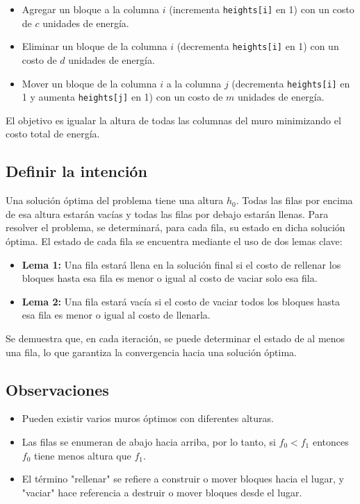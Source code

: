 \documentclass[a4paper,12pt]{article}
\begin{document}
\begin{itemize}
	\item Agregar un bloque a la columna $i$ (incrementa \texttt{heights[i]} en 1) con un costo de $c$ unidades de energía.
	\item Eliminar un bloque de la columna $i$ (decrementa \texttt{heights[i]} en 1) con un costo de $d$ unidades de energía.
	\item Mover un bloque de la columna $i$ a la columna $j$ (decrementa \texttt{heights[i]} en 1 y aumenta \texttt{heights[j]} en 1) con un costo de $m$ unidades de energía.
\end{itemize}

El objetivo es igualar la altura de todas las columnas del muro minimizando el costo total de energía.

\subsection{Definir la intención}

Una solución óptima del problema tiene una altura $h_0$. Todas las filas por encima de esa altura estarán vacías y todas las filas por debajo estarán llenas. Para resolver el problema, se determinará, para cada fila, su estado en dicha solución óptima. El estado de cada fila se encuentra mediante el uso de dos lemas clave:

\begin{itemize}
	\item \textbf{Lema 1:} Una fila estará llena en la solución final si el costo de rellenar los bloques hasta esa fila es menor o igual al costo de vaciar solo esa fila.
	\item \textbf{Lema 2:} Una fila estará vacía si el costo de vaciar todos los bloques hasta esa fila es menor o igual al costo de llenarla.
\end{itemize}

Se demuestra que, en cada iteración, se puede determinar el estado de al menos una fila, lo que garantiza la convergencia hacia una solución óptima.

\subsection{Observaciones}

\begin{itemize}
	\item Pueden existir varios muros óptimos con diferentes alturas.
	\item Las filas se enumeran de abajo hacia arriba, por lo tanto, si $f_0 < f_1$ entonces $f_0$ tiene menos altura que $f_1$.
	\item El término "rellenar" se refiere a construir o mover bloques hacia el lugar, y "vaciar" hace referencia a destruir o mover bloques desde el lugar.
\end{itemize}
\end{document}
